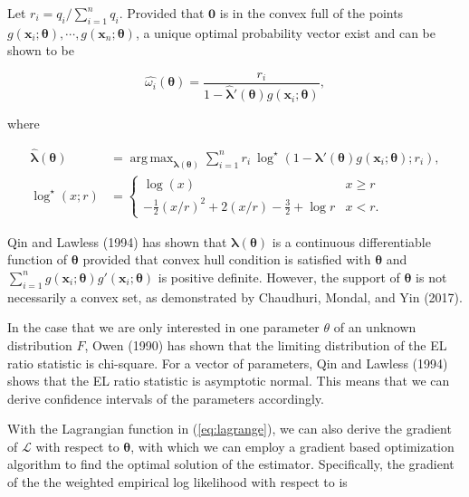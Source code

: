 \documentclass[article]{jss}
\renewcommand{\|}{\,|\,}
\begin{document}
Let \(r_i = q_i/\sum_{i=1}^n q_i\). Provided that \(\bm 0\) is in the convex full of the points \(g(\bm x_i;\bm \theta),\cdots,g(\bm x_n;\bm \theta)\), a unique optimal probability vector exist and can be shown to be

\begin{equation}\label{eq:omegahat}
  \hat{\omega_i}(\bm \theta) = \frac{r_i}{1 - \hat{\bm \lambda}'(\bm \theta) g(\bm x_i;\bm \theta)},
\end{equation}

where

\begin{equation}
\begin{aligned}
\hat{\bm \lambda}(\bm \theta) &= \mathop{\mathrm{arg\,max}}_{\bm \lambda(\bm \theta)} \sum_{i=1}^n r_i\ {\log}^{\star}\left(1 - \bm \lambda'(\bm \theta) g(\bm x_i;\bm \theta); r_i\right), \\
{\log}^{\star}(x; r) &=
\begin{cases}
\log(x) & x \ge r \\
- \frac{1}{2} (x/r)^2 + 2 (x/r) - \frac{3}{2} + \log r & x < r.
\end{cases}
\end{aligned}
\label{eq:optim}
\end{equation}

Qin and Lawless (1994) has shown that \(\bm \lambda(\bm \theta)\) is a continuous differentiable function of \(\bm \theta\) provided that convex hull condition is satisfied with \(\bm \theta\) and \(\sum_{i=1}^n g(\bm x_i;\bm \theta)g'(\bm x_i;\bm \theta)\) is positive definite. However, the support of \(\bm \theta\) is not necessarily a convex set, as demonstrated by Chaudhuri, Mondal, and Yin (2017).

In the case that we are only interested in one parameter \(\theta\) of an unknown distribution \(F\), Owen (1990) has shown that the limiting distribution of the EL ratio statistic is chi-square. For a vector of parameters, Qin and Lawless (1994) shows that the EL ratio statistic is asymptotic normal. This means that we can derive confidence intervals of the parameters accordingly.

With the Lagrangian function in (\ref{eq:lagrange}), we can also derive the gradient of \(\mathcal{L}\) with respect to \(\bm \theta\), with which we can employ a gradient based optimization algorithm to find the optimal solution of the estimator. Specifically, the gradient of the the weighted empirical log likelihood with respect to is
\end{document}
